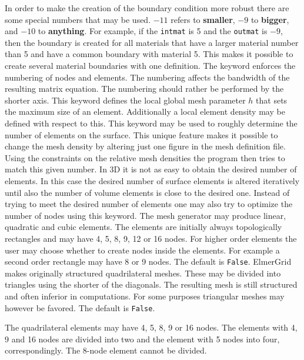 In order to make the creation of the boundary condition
more robust there are some special numbers that may be used.
$-11$ refers to \textbf{smaller}, $-9$ to \textbf{bigger}, 
and $-10$ to \textbf{anything}. For example, if the 
\texttt{intmat} is 5 and the \texttt{outmat} is $-9$, then
the boundary is created for all materials that have a larger
material number than 5 and have a common boundary with 
material 5. This makes it possible to create several 
material boundaries with one definition.
%
The keyword enforces the numbering of nodes and elements.
The numbering affects the 
bandwidth of the resulting matrix equation.
The numbering should rather be performed by the shorter axis.
%
This keyword defines the local global mesh parameter $h$ that
sets the maximum size of an element. Additionally a local element density
may be defined with respect to this. 
%
This keyword may be used to roughly determine the number
of elements on the surface. This unique feature makes it possible to
change the mesh density by altering just one figure in the
mesh definition file.
Using the constraints on the relative mesh densities 
the program then tries to match this given number.  
%
In 3D it is not as easy to obtain the desired 
number of elements. In this case the desired number of surface elements
is altered iteratively until also the number of volume elements is close to the
desired one.
%
Instead of trying to meet the desired number of elements one may also 
try to optimize the number of nodes using this keyword.
%
The mesh generator may produce linear, quadratic and 
cubic elements. 
The elements are initially always topologically rectangles and
may have 4, 5, 8, 9, 12 or 16 nodes. 
%
For higher order elements the user may choose whether to
create nodes inside the elements. For example a second order rectangle 
may have 8 or 9 nodes. The default is \texttt{False}.
%
ElmerGrid makes originally structured quadrilateral meshes.
These may be divided into triangles 
using the shorter of the diagonals.
The resulting mesh is still structured and
often inferior in computations. For some purposes triangular meshes 
may however be favored. The default is \texttt{False}.

The quadrilateral elements may have 4, 5, 8, 9 or 16 nodes. The 
elements with 4, 9  and 16 nodes are divided into two and the element with
5 nodes into four, correspondingly. The 8-node element cannot be divided.

